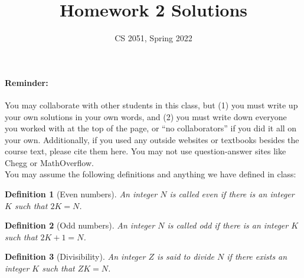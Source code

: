 \documentclass{article}
\newtheorem{definition}{Definition}[section]
\begin{document}
\title{Homework 2 Solutions}
\author{CS 2051, Spring 2022}
\date{}
\maketitle

\paragraph{Reminder:} You may collaborate with other students in this
class, but (1) you must write up your own solutions in your own words, and (2) 
you must write down everyone you worked with at the top of the page, or ``no 
collaborators'' if you did it all on your own. Additionally, if you used any outside websites or textbooks besides the course text, please cite them here. You may not use question-answer sites like Chegg or MathOverflow. \\

You may assume the following definitions and anything we have defined in class:

\begin{definition}[Even numbers]
An integer $N$ is called even if there is an integer $K$ such that $2K = N$.
\end{definition}

\begin{definition}[Odd numbers]
An integer $N$ is called odd if there is an integer $K$ such that $2K + 1 = N$.
\end{definition}

\begin{definition}[Divisibility]
An integer $Z$ is said to divide $N$ if there exists an integer $K$ such that $ZK = N$.
\end{definition}


\hrulefill
\end{document}
